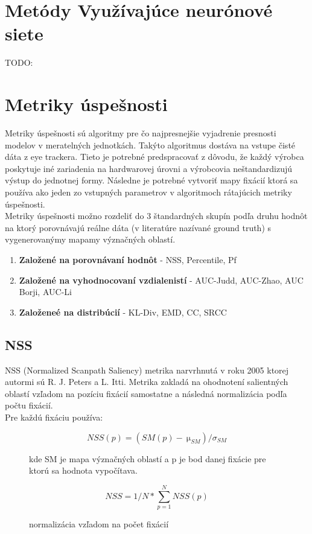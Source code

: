\section{Metódy Využívajúce neurónové siete}
TODO:

\section{Metriky úspešnosti}
Metriky úspešnosti sú algoritmy pre čo najpresnejšie vyjadrenie presnosti modelov v meratelných jednotkách. Takýto algoritmus dostáva na vstupe čisté dáta z eye trackera. Tieto je potrebné predspracovať z dôvodu, že každý výrobca poskytuje iné zariadenia na hardwarovej úrovni a výrobcovia neštandardizujú výstup do jednotnej formy. Následne je potrebné vytvoriť mapy fixácií ktorá sa používa ako jeden zo vstupných parametrov v algoritmoch rátajúcich metriky úspešnosti. \\
Metriky úspešnosti možno rozdeliť do 3 štandardných skupín podľa druhu hodnôt na ktorý porovnávajú reálne dáta (v literatúre nazívané ground truth) s vygenerovanýmy mapamy význačných oblastí\cite{metrics-1}.
\begin{enumerate}
  \item\textbf{Založené na porovnávaní hodnôt} - NSS, Percentile, Pf
  \item\textbf{Založené na vyhodnocovaní vzdialenistí} - AUC-Judd, AUC-Zhao, AUC Borji, AUC-Li
  \item\textbf{Založeneé na distribúcií} - KL-Div, EMD, CC, SRCC
\end{enumerate}

\subsection{NSS}
NSS (Normalized Scanpath Saliency) metrika narvrhnutá v roku 2005 ktorej autormi sú R. J. Peters a L. Itti. Metrika zakladá na ohodnotení salientných oblastí vzľadom na pozíciu fixácií samostatne a následná normalizácia podľa počtu fixácií. \\
Pre každú fixáciu používa:
\begin{figure}
  \begin{equation}
    NSS(p) =  (SM(p)-\SI{}{\micro}_{SM}) / 	\sigma_{SM}
  \end{equation}
  \caption{kde SM je mapa význačných oblastí a p je bod danej fixácie pre ktorú sa hodnota vypočítava.}

  \begin{equation}
    NSS = 1/N * \sum_{p=1}^{N}NSS(p)
  \end{equation}
  \caption{normalizácia vzľadom na počet fixácií}
\end{figure}

